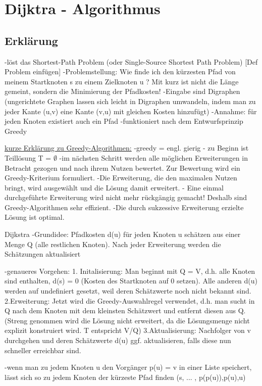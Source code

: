 \chapter{Dijktra - Algorithmus}

\section{Erklärung}

-löst das Shortest-Path Problem (oder Single-Source Shortest Path Problem)
[Def Problem einfügen]
-Problemstellung: Wie finde ich den kürzesten Pfad von meinem Startknoten s zu einem Zielknoten u ? Mit kurz ist nicht die Länge gemeint, sondern die Minimierung der Pfadkosten!
-Eingabe sind Digraphen (ungerichtete Graphen lassen sich leicht in Digraphen umwandeln, indem man zu jeder Kante (u,v) eine Kante (v,u) mit gleichen Kosten hinzufügt)
-Annahme: für jeden Knoten existiert auch ein Pfad
-funktioniert nach dem Entwurfsprinzip Greedy

\underline{kurze Erklärung zu Greedy-Algorithmen:}
-greedy = engl. gierig
- zu Beginn  ist Teillösung T = $\emptyset$
-im nächsten Schritt werden alle möglichen Erweiterungen in Betracht gezogen und nach ihrem Nutzen bewertet. Zur Bewertung wird ein Greedy-Kriterium formuliert.
-Die Erweiterung, die den maximalen Nutzen bringt, wird ausgewählt und die Lösung damit erweitert. 
- Eine einmal durchgeführte Erweiterung wird nicht mehr rückgängig gemacht! Deshalb sind Greedy-Algorithmen sehr effizient.
-Die durch sukzessive Erweiterung erzielte Lösung ist optimal.

Dijkstra 
-Grundidee:  Pfadkosten d(u) für jeden Knoten u schätzen aus einer Menge Q (alle restlichen Knoten). Nach jeder Erweiterung werden die Schätzungen aktualisiert

-genaueres Vorgehen:
1. Initalisierung: Man beginnt mit Q = V, d.h. alle Knoten sind enthalten, d(s) = 0 (Kosten des Startknoten auf 0 setzen). Alle anderen d(u) werden auf undefiniert gesetzt, weil deren Schätzwerte noch nicht bekannt sind.
2.Erweiterung: Jetzt wird die Greedy-Auswahlregel verwendet, d.h. man sucht in Q nach dem Knoten mit dem kleinsten Schätzwert und entfernt diesen aus Q. (Streng genommen wird die Lösung nicht erweitert, da die Lösungsmenge nicht explizit konstruiert wird. T entspricht V/Q)
3.Aktualisierung: Nachfolger von v durchgehen und deren Schätzwerte d(u) ggf. aktualisieren, falls diese nun schneller erreichbar sind.

-wenn man zu jedem Knoten u den Vorgänger p(u) = v in einer Liste speichert, lässt sich so zu jedem Knoten der kürzeste Pfad finden 
(s, ... , p(p(u)),p(u),u) 


